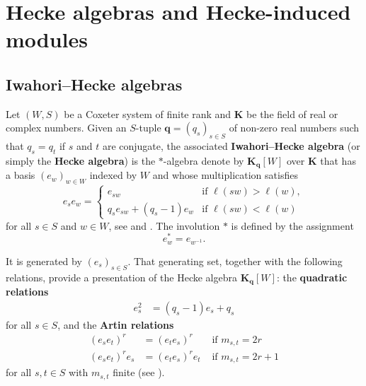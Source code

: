 \documentclass[12pt,a4paper]{amsproc}
\theoremstyle{definition}
\newcommand{\KK}{\mathbf K}
\begin{document}
\section{Hecke algebras and Hecke-induced modules}\label{sec:Hecke}

\subsection{Iwahori--Hecke algebras}
\label{sec:hecke-preliminaries}

Let $(W, S)$ be a Coxeter system of finite rank and $\KK$ be the field of real or complex numbers. Given an $S$-tuple $\mathbf q = (q_s)_{s \in S}$ of non-zero real numbers such that $q_s = q_t$ if $s$ and $t$ are conjugate, the associated \textbf{Iwahori--Hecke algebra} (or simply the \textbf{Hecke algebra}) is the    $*$-algebra denote by $\KK_{\mathbf q}[W]$ over $\KK$  that has a basis $(e_w)_{w \in W}$ indexed by $W$ and whose multiplication satisfies
$$e_s e_w= \left\{
\begin{array}{ll}
e_{sw} & \text{if } \ell(sw) > \ell(w),\\
q_s e_{sw} + (q_s-1) e_w & \text{if } \ell(sw) < \ell(w)
\end{array}
\right.$$
for all $s \in S$ and $w \in W$, see \cite[\S19.1]{Davis} and \cite[CH.~IV, Exer.~23]{Bour}. The involution $*$ is defined by the assignment 
$$e_w^* = e_{w^{-1}}.$$ 

It is generated by $(e_s)_{s \in S}$. That generating set, together with the following relations, provide a presentation of the Hecke algebra $\KK_{\mathbf q}[W]$:
the \textbf{quadratic relations}
\begin{align*}
 e^2_s & =  (q_s-1) e_s + q_s 
 \end{align*}
 for all $s \in S$, and the \textbf{Artin relations}
 \begin{align*} (e_s e_t)^r& =  (e_t e_s)^r & \text{ if }  m_{s, t} = 2r \\
 (e_s e_t)^r e_s& =  (e_t e_s)^r e_t & \text{ if }  m_{s, t} = 2r+1 
\end{align*}
for all $s, t \in S$ with $m_{s, t}$ finite (see \cite[Ch.~IV, \S 2, Exer.~23]{Bour}). 
\end{document}
